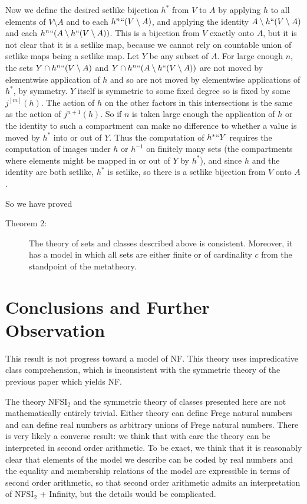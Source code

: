 \documentclass{article}
\begin{document}
\begin{description}
Now we define the desired setlike bijection $h^*$ from $V$ to $A$ by applying $h$ to all elements of $V \setminus A$ and to each $h^n``(V \setminus A)$, and applying the
identity $A \setminus h``(V \setminus A)$ and each $h^n``(A \setminus h``(V \setminus  A))$.  This is a bijection from $V$ exactly onto $A$, but it is not clear that it is a setlike map,
because we cannot rely on countable union of setlike maps being a setlike map.  Let $Y$ be any subset of $A$.  For large enough $n$, the sets $Y \cap h^n``(V \setminus A)$
and  $Y \cap h^n``(A \setminus h``(V \setminus  A))$ are not moved by elementwise application of $h$ and so are not moved by elementwise applications of $h^*$, by symmetry.
$Y$ itself is symmetric to some fixed degree so is fixed by some $j^[m](h)$.  The action of $h$ on the other factors in this intersections is the same as the action of $j^{n+1}(h)$.  So if $n$ is taken large enough the application of $h$ or the identity to such a compartment can make no difference to whether a value is moved by $h^*$ into or out of $Y$.
Thus the computation of $h^*``Y$ requires the computation of images under $h$ or $h^{-1}$ on  finitely many sets (the compartments where elements might be mapped in or out of $Y$ by $h^*$), and since $h$ and the identity are both setlike, $h^*$ is setlike, so there is a setlike bijection from $V$ onto $A$.

So we have proved

\begin{description}

\item[Theorem 2:]  The theory of sets and classes described above is consistent.  Moreover, it has a model in which all sets are either finite or of cardinality $c$ from the standpoint of the metatheory.

\end{description}

\section{Conclusions and Further Observation}

This result is not progress toward a model of NF.  This theory uses impredicative class comprehension, which is inconsistent with the symmetric theory of the previous paper which yields NF.

The theory NFSI$_2$ and the symmetric theory of classes presented here are not mathematically entirely trivial.  Either theory can define Frege natural numbers and can define real numbers
as arbitrary unions of Frege natural numbers.  There is very likely a converse result:  we think that with care the theory can be interpreted in second order arithmetic.  To be exact, we think that it is reasonably clear that 
elements of the model we describe can be coded by real numbers and the  equality and membership relations of the model are expressible in terms of second order arithmetic, so that
second order arithmetic admits an interpretation of NFSI$_2$ + Infinity, but the details would be complicated.


\end{description}
\end{document}
